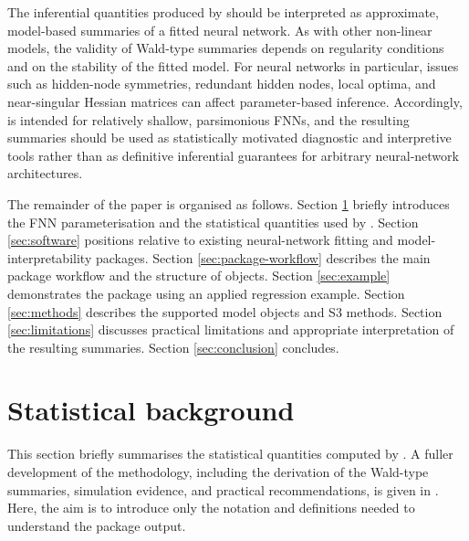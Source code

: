 The inferential quantities produced by  should be interpreted as approximate, model-based summaries of a fitted neural network.
As with other non-linear models, the validity of Wald-type summaries depends on regularity conditions and on the stability of the fitted model.
For neural networks in particular, issues such as hidden-node symmetries, redundant hidden nodes, local optima, and near-singular Hessian matrices can affect parameter-based inference.
Accordingly,  is intended for relatively shallow, parsimonious FNNs, and the resulting summaries should be used as statistically motivated diagnostic and interpretive tools rather than as definitive inferential guarantees for arbitrary neural-network architectures.

The remainder of the paper is organised as follows.
Section \ref{sec:fnn-background} briefly introduces the FNN parameterisation and the statistical quantities used by .
Section \ref{sec:software} positions  relative to existing neural-network fitting and model-interpretability packages.
Section \ref{sec:package-workflow} describes the main package workflow and the structure of  objects.
Section \ref{sec:example} demonstrates the package using an applied regression example.
Section \ref{sec:methods} describes the supported model objects and S3 methods.
Section \ref{sec:limitations} discusses practical limitations and appropriate interpretation of the resulting summaries.
Section \ref{sec:conclusion} concludes.

\section{Statistical background}\label{sec:fnn-background}

This section briefly summarises the statistical quantities computed by .
A fuller development of the methodology, including the derivation of the Wald-type summaries, simulation evidence, and practical recommendations, is given in \citet{mcinerney2023feedforward}.
Here, the aim is to introduce only the notation and definitions needed to understand the package output.

